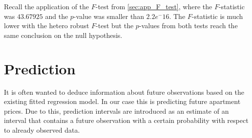 Recall the application of the $F$-test from \ref{sec:app_F_test}, where the $F$-statistic was $43.67925$ and the $p$-value was smaller than $2.2e^-16$. The $F$-statistic is much lower with the hetero robust $F$-test but the $p$-values from both tests reach the same conclusion on the null hypothesis. 




    

































\section{Prediction}\label{sec:prediction}
It is often wanted to deduce information about future observations based on the existing fitted regression model. 
In our case this is predicting future apartment prices. 
Due to this, prediction intervals are introduced as an estimate of an interval that contains a future observation with a certain probability with respect to already observed data.

